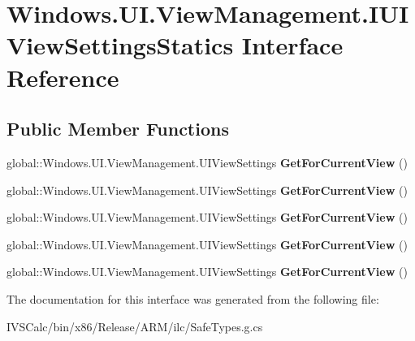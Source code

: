 \hypertarget{interface_windows_1_1_u_i_1_1_view_management_1_1_i_u_i_view_settings_statics}{}\section{Windows.\+U\+I.\+View\+Management.\+I\+U\+I\+View\+Settings\+Statics Interface Reference}
\label{interface_windows_1_1_u_i_1_1_view_management_1_1_i_u_i_view_settings_statics}
\subsection*{Public Member Functions}
\begin{DoxyCompactItemize}
\item 
\mbox{\label{interface_windows_1_1_u_i_1_1_view_management_1_1_i_u_i_view_settings_statics_a192cc8ed9f5bad242f246af66348c9b2}} 
global\+::\+Windows.\+U\+I.\+View\+Management.\+U\+I\+View\+Settings {\bfseries Get\+For\+Current\+View} ()
\item 
\mbox{\label{interface_windows_1_1_u_i_1_1_view_management_1_1_i_u_i_view_settings_statics_a192cc8ed9f5bad242f246af66348c9b2}} 
global\+::\+Windows.\+U\+I.\+View\+Management.\+U\+I\+View\+Settings {\bfseries Get\+For\+Current\+View} ()
\item 
\mbox{\label{interface_windows_1_1_u_i_1_1_view_management_1_1_i_u_i_view_settings_statics_a192cc8ed9f5bad242f246af66348c9b2}} 
global\+::\+Windows.\+U\+I.\+View\+Management.\+U\+I\+View\+Settings {\bfseries Get\+For\+Current\+View} ()
\item 
\mbox{\label{interface_windows_1_1_u_i_1_1_view_management_1_1_i_u_i_view_settings_statics_a192cc8ed9f5bad242f246af66348c9b2}} 
global\+::\+Windows.\+U\+I.\+View\+Management.\+U\+I\+View\+Settings {\bfseries Get\+For\+Current\+View} ()
\item 
\mbox{\label{interface_windows_1_1_u_i_1_1_view_management_1_1_i_u_i_view_settings_statics_a192cc8ed9f5bad242f246af66348c9b2}} 
global\+::\+Windows.\+U\+I.\+View\+Management.\+U\+I\+View\+Settings {\bfseries Get\+For\+Current\+View} ()
\end{DoxyCompactItemize}


The documentation for this interface was generated from the following file\+:\begin{DoxyCompactItemize}
\item 
I\+V\+S\+Calc/bin/x86/\+Release/\+A\+R\+M/ilc/Safe\+Types.\+g.\+cs\end{DoxyCompactItemize}
